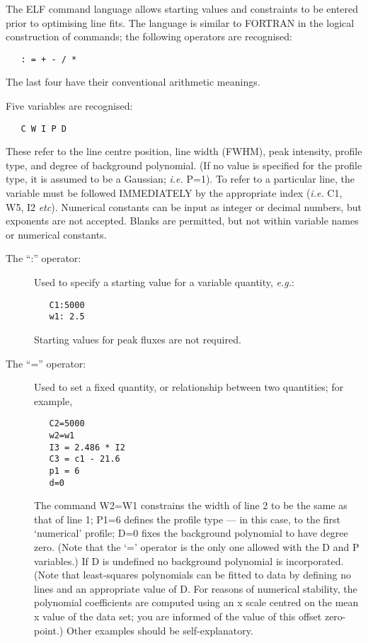 \documentclass[twoside,11pt]{article}
\renewcommand{\_}{\texttt{\symbol{95}}}
\begin{document}
\begin {description}
The ELF command language allows starting values and constraints to be
entered prior to optimising line fits. The language is similar to
FORTRAN in the logical construction of commands; the following
operators are recognised:

\begin{verbatim}
   : = + - / *
\end{verbatim}

The last four have their conventional arithmetic meanings.

Five variables are recognised:

\begin{verbatim}
   C W I P D
\end{verbatim}

These refer to the line centre position, line width (FWHM), peak
intensity, profile type, and degree of background polynomial. (If no
value is specified for the profile type, it is assumed to be a
Gaussian; {\em i.e.} P=1). To refer to a particular line, the variable
must be followed IMMEDIATELY by the appropriate index ({\em i.e.} C1,
W5, I2 {\em etc}). Numerical constants can be input as integer or decimal
numbers, but exponents are not accepted. Blanks are permitted, but not
within variable names or numerical constants.

\begin{description}

\item [The ``:'' operator:]

Used to specify a starting value for a variable quantity, {\em e.g.}:

\begin{verbatim}
   C1:5000
   w1: 2.5
\end{verbatim}

Starting values for peak fluxes are not required.

\item [The ``='' operator:]

Used to set a fixed quantity, or relationship between two quantities; for
example,

\begin{verbatim}
   C2=5000
   w2=w1
   I3 = 2.486 * I2
   C3 = c1 - 21.6
   p1 = 6
   d=0
\end{verbatim}

The command W2=W1 constrains the width of line 2 to be the same as
that of line 1; P1=6 defines the profile type --- in this case, to the
first `numerical' profile; D=0 fixes the background polynomial to have
degree zero. (Note that the `=' operator is the only one allowed with
the D and P variables.) If D is undefined no background polynomial is
incorporated. (Note that least-squares polynomials can be fitted to
data by defining no lines and an appropriate value of D. For reasons
of numerical stability, the polynomial coefficients are computed using
an x scale centred on the mean x value of the data set; you are
informed of the value of this offset zero-point.) Other examples
should be self-explanatory.


\end{description}
\end{description}
\end{document}
